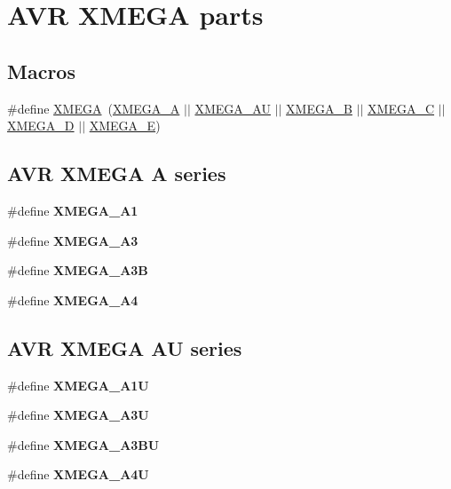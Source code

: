 \hypertarget{group__xmega__part__macros__group}{\section{A\-V\-R X\-M\-E\-G\-A parts}
\label{group__xmega__part__macros__group}
}
\subsection*{Macros}
\begin{DoxyCompactItemize}
\item 
\#define \hyperlink{group__xmega__part__macros__group_ga959bff90afbae437308a52eeb67b3368}{X\-M\-E\-G\-A}~(\hyperlink{group__xmega__part__macros__group_gab903a90d3a0bc99d7248eaecbb325a23}{X\-M\-E\-G\-A\-\_\-\-A} $|$$|$ \hyperlink{group__xmega__part__macros__group_ga55210f3805902072fce76647b50fa177}{X\-M\-E\-G\-A\-\_\-\-A\-U} $|$$|$ \hyperlink{group__xmega__part__macros__group_ga62f2c1c93640237425cb64186ddce219}{X\-M\-E\-G\-A\-\_\-\-B} $|$$|$ \hyperlink{group__xmega__part__macros__group_ga75b06dd59d29b1de54dd73fe67830973}{X\-M\-E\-G\-A\-\_\-\-C} $|$$|$ \hyperlink{group__xmega__part__macros__group_gacc9e4b074c3f87ce7b461483b0beb15c}{X\-M\-E\-G\-A\-\_\-\-D} $|$$|$ \hyperlink{group__xmega__part__macros__group_gaab6d2543c5128fca0b1aeecb5c080723}{X\-M\-E\-G\-A\-\_\-\-E})
\end{DoxyCompactItemize}
\subsection*{A\-V\-R X\-M\-E\-G\-A A series}
\begin{DoxyCompactItemize}
\item 
\#define {\bfseries X\-M\-E\-G\-A\-\_\-\-A1}
\item 
\#define {\bfseries X\-M\-E\-G\-A\-\_\-\-A3}
\item 
\#define {\bfseries X\-M\-E\-G\-A\-\_\-\-A3\-B}
\item 
\#define {\bfseries X\-M\-E\-G\-A\-\_\-\-A4}
\end{DoxyCompactItemize}
\subsection*{A\-V\-R X\-M\-E\-G\-A A\-U series}
\begin{DoxyCompactItemize}
\item 
\#define {\bfseries X\-M\-E\-G\-A\-\_\-\-A1\-U}
\item 
\#define {\bfseries X\-M\-E\-G\-A\-\_\-\-A3\-U}
\item 
\#define {\bfseries X\-M\-E\-G\-A\-\_\-\-A3\-B\-U}
\item 
\#define {\bfseries X\-M\-E\-G\-A\-\_\-\-A4\-U}
\end{DoxyCompactItemize}

